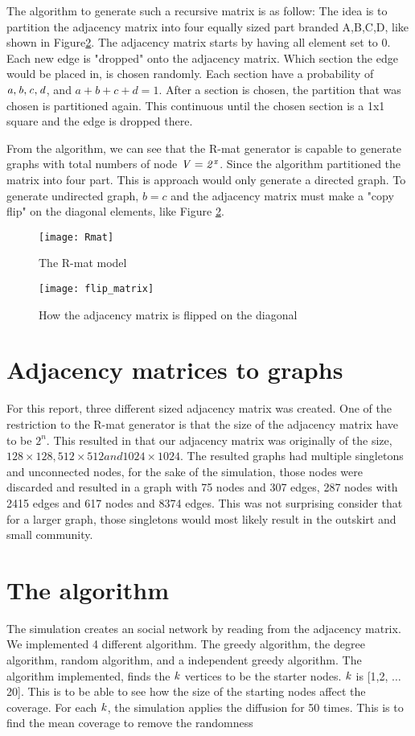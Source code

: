 The algorithm to generate such a recursive matrix is as follow: The idea is to partition the adjacency matrix into four equally sized part branded A,B,C,D, like shown in Figure\ref{fig:flipDiagonal}. The adjacency matrix starts by having all element set to 0. Each new edge is "dropped" onto the adjacency matrix. Which section the edge would be placed in, is chosen randomly. Each section have a probability of $\it{a, b, c, d}$, and $a + b + c + d = 1$. After a section is chosen, the partition that was chosen is partitioned again. This continuous until the chosen section is a 1x1 square and the edge is dropped there. 

From the algorithm, we can see that the R-mat generator is capable to generate graphs with total numbers of node $ \it{V} = 2^x$. Since the algorithm partitioned the matrix into four part. This is approach would only generate a directed graph. To generate undirected graph, $b = c$ and the adjacency matrix must make a "copy flip" on the diagonal elements, like Figure \ref{fig:flipDiagonal}. 

\begin{figure}
\texttt{[image: Rmat]}
\caption{The R-mat model}
\label{fig:Rmat}
\end{figure}

\begin{figure}
\texttt{[image: flip\_matrix]}
\caption{How the adjacency matrix is flipped on the diagonal}
\label{fig:flipDiagonal}

\end{figure}


\section{Adjacency matrices to graphs}
For this report, three different sized adjacency matrix was created. One of the restriction to the R-mat generator is that the size of the adjacency matrix have to be $2^n$. This resulted in that our adjacency matrix was originally of the size, $128 \times 128, 512 \times 512 and 1024 \times 1024$. The resulted graphs had multiple singletons and unconnected nodes, for the sake of the simulation, those nodes were discarded and resulted in a graph with 75 nodes and 307 edges, 287 nodes with 2415 edges and 617 nodes and 8374 edges. This was not surprising consider that for a larger graph, those singletons would most likely result in the outskirt and small community.

\section{The algorithm}
The simulation creates an social network by reading from the adjacency matrix. We implemented 4 different algorithm. The greedy algorithm, the degree algorithm, random algorithm, and a independent greedy algorithm. The algorithm implemented, finds the $\it{k}$ vertices to be the starter nodes. $\it{k}$ is [1,2,  $\dots$ 20]. This is to be able to see how the size of the starting nodes affect the coverage. For each $\it{k}$, the simulation applies the diffusion for 50 times. This is to find the mean coverage to remove the randomness 

